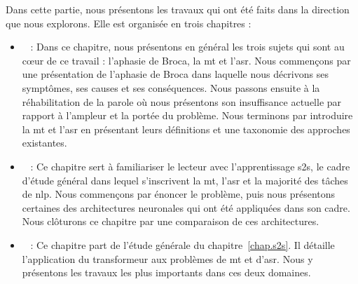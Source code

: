 Dans cette partie, nous présentons les travaux qui ont été faits dans la direction que nous explorons.
Elle est organisée en trois chapitres :
\begin{itemize}
    \item {}~ :    
    Dans ce chapitre, nous présentons en général les trois sujets qui sont au cœur de ce travail :
    l'aphasie de Broca, la \gls{mt} et l'\gls{asr}.
    Nous commençons par une présentation de l'aphasie de Broca 
    dans laquelle nous décrivons ses symptômes, ses causes et ses conséquences.
    Nous passons ensuite à la réhabilitation de la parole où nous présentons son insuffisance actuelle
    par rapport à l'ampleur et la portée du problème.
    Nous terminons par introduire la \gls{mt} et l'\gls{asr} 
    en présentant leurs définitions et une taxonomie des approches existantes.
    
    \item {}~ :
    Ce chapitre sert à familiariser le lecteur avec l'apprentissage \gls{s2s},
    le cadre d'étude général dans lequel s'inscrivent la \gls{mt}, l'\gls{asr} et la majorité des tâches de \gls{nlp}.
    Nous commençons par énoncer le problème, 
    puis nous présentons certaines des architectures neuronales qui ont été appliquées dans son cadre.
    Nous clôturons ce chapitre par une comparaison de ces architectures.
    
    \item {}~ :    
    Ce chapitre part de l'étude générale du chapitre~\ref{chap.s2s}.
    Il détaille l'application du transformeur aux problèmes de \gls{mt} et d'\gls{asr}.
    Nous y présentons les travaux les plus importants dans ces deux domaines.
\end{itemize}

\subsection*{~}

